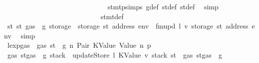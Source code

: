 \begin{isabellebody}
\ \ \ \ \ \ \ \ \ \ \ \ \ \ \ \ \ \ \ \ \ \ \ \ \ \ \ \ \isamarkupfalse%
\ stmt{\isachardot}{\kern0pt}psimps{\isacharparenleft}{\kern0pt}{}{\isacharparenright}{\kern0pt}\ g{\isacharunderscore}{\kern0pt}def\ st{\isacharprime}{\kern0pt}{\isacharunderscore}{\kern0pt}def\ st{\isacharprime}{\kern0pt}{\isacharprime}{\kern0pt}{\isacharunderscore}{\kern0pt}def\ \isamarkupfalse%
\ simp\isanewline
\ \ \ \ \ \ \ \ \ \ \ \ \ \ \ \ \ \ \ \ \ \ \ \ \ \ \isamarkupfalse%
\ stmt{\isacharunderscore}{\kern0pt}def\ \isamarkupfalse%
\ {\isachardoublequoteopen}st{}{\isacharprime}{\kern0pt}{\isacharequal}{\kern0pt}\ st{\isacharprime}{\kern0pt}{\isacharprime}{\kern0pt}\ {\isasymlparr}gas\ {\isacharcolon}{\kern0pt}{\isacharequal}{\kern0pt}\ g{\isacharprime}{\kern0pt}{\isacharprime}{\kern0pt}{\isacharcomma}{\kern0pt}\ storage\ {\isacharcolon}{\kern0pt}{\isacharequal}{\kern0pt}\ {\isacharparenleft}{\kern0pt}storage\ st{\isacharprime}{\kern0pt}{\isacharprime}{\kern0pt}{\isacharparenright}{\kern0pt}\ {\isacharparenleft}{\kern0pt}address\ env\ {\isacharcolon}{\kern0pt}{\isacharequal}{\kern0pt}\ fmupd\ l\ v{\isacharprime}{\kern0pt}\ {\isacharparenleft}{\kern0pt}storage\ st{\isacharprime}{\kern0pt}{\isacharprime}{\kern0pt}\ {\isacharparenleft}{\kern0pt}address\ env{\isacharparenright}{\kern0pt}{\isacharparenright}{\kern0pt}{\isacharparenright}{\kern0pt}{\isasymrparr}{\isachardoublequoteclose}\ \isamarkupfalse%
\ simp\isanewline
\ \ \ \ \ \ \ \ \ \ \ \ \ \ \ \ \ \ \ \ \ \ \ \ \ \ \isamarkupfalse%
\ \isamarkupfalse%
\ lexp{\isacharunderscore}{\kern0pt}gas\ {\isacharbackquoteopen}{\isasymnot}\ gas\ st\ {\isasymle}\ g{\isacharbackquoteclose}\ n\ Pair\ KValue\ Value\ n{}\ p{}\ \isamarkupfalse%
\ {\isachardoublequoteopen}gas\ {\isacharparenleft}{\kern0pt}st{\isacharprime}{\kern0pt}{\isacharprime}{\kern0pt}{\isasymlparr}gas\ {\isacharcolon}{\kern0pt}{\isacharequal}{\kern0pt}\ g{\isacharprime}{\kern0pt}{\isacharprime}{\kern0pt}{\isacharcomma}{\kern0pt}\ stack\ {\isacharcolon}{\kern0pt}{\isacharequal}{\kern0pt}\ updateStore\ l\ {\isacharparenleft}{\kern0pt}KValue\ v{\isacharprime}{\kern0pt}{\isacharparenright}{\kern0pt}\ {\isacharparenleft}{\kern0pt}stack\ st{\isacharparenright}{\kern0pt}{\isasymrparr}{\isacharparenright}{\kern0pt}\ {\isasymle}\ gas\ {\isacharparenleft}{\kern0pt}st{\isacharprime}{\kern0pt}{\isasymlparr}gas\ {\isacharcolon}{\kern0pt}{\isacharequal}{\kern0pt}\ g{\isacharprime}{\kern0pt}{\isasymrparr}{\isacharparenright}{\kern0pt}{\isachardoublequoteclose}\ \isamarkupfalse%

\end{isabellebody}
